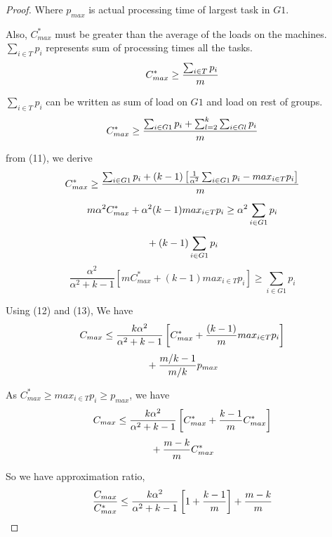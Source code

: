 \documentclass[10pt, conference, compsocconf]{IEEEtran}
\begin{document}
\begin{proof}
Where $p_{max}$ is actual processing time of largest task in $G1$. 

Also, $C_{max}^{*}$ must be greater than the average of the  loads on   the machines. $\sum_{i \in T }{{p_{i}}}$ represents sum of processing times all the tasks.
\begin{equation}{\nonumber}
C_{max}^{*} \geq  \frac{\sum_{i \in T }^{}{{p_{i}}}}{m}
\end{equation}

$\sum_{i \in T }{{p_{i}}}$ can be written as sum of load on $G1$ and load on rest of groups.
\begin{equation}
{\nonumber} C_{max}^{*} \geq  \frac{\sum_{i \in G1 }^{}{{p_{i}}}+ \sum_{l=2}^{k}\sum_{i \in Gl }^{}{{p_{i}}}}{m}
\end{equation}

from (11), we derive
\begin{equation}{\nonumber}
 C_{max}^{*} \geq  \frac{\sum_{i \in G1 }^{}{{p_{i}}}+ (k-1)\left[\frac{1}{\alpha^{2}}\sum_{i \in G1 }^{}{{p_{i}}}-  {max_{i \in T}}{{p_{i}}}\right]}{m}
\end{equation}
\begin{equation}{\nonumber}
 m\alpha^{2}C_{max}^{*} + \alpha^{2} (k-1){max_{i \in T}}{{p_{i}}} \geq  \alpha^{2}\sum_{i \in G1 }^{}{{p_{i}}}  
\end{equation}
\begin{equation}{\nonumber}
 + (k-1)\sum_{i \in G1 }^{}{{p_{i}}} 
\end{equation}
\begin{equation}
\frac{\alpha^{2}}{\alpha^{2}+k-1}\left[m C_{max}^{*}+(k-1) {max_{i \in T}}{{p_{i}}}\right] \geq \sum_{i \in G1 }^{}{{p_{i}}}  
\end{equation}

Using (12) and (13), We have
\begin{equation}{\nonumber}
C_{max} \leq \frac{k\alpha^{2}}{\alpha^{2}+k-1}\left[ C_{max}^{*}+\frac{(k-1)}{m} {max_{i \in T}}{{p_{i}}}\right]
\end{equation}
\begin{equation}{\nonumber}
 + {\frac{m/k-1}{m/k}} p_{max} 
\end{equation}

 As $C_{max}^{*}\geq {{max_{i \in T}}{p_{i}}}\geq p_{max}$, we have
\begin{equation}{\nonumber}
 C_{max} \leq \frac{k\alpha^{2}}{\alpha^{2}+k-1}\left[ C_{max}^{*}+ {\frac{k-1}{m}}{C_{max}^{*}}\right] 
  \end{equation}
 \begin{equation}{\nonumber}
   + {\frac{m-k}{m}} C_{max}^{*} 
   \end{equation} 
 
 So we have approximation ratio,
 \begin{equation}{\nonumber}
\frac{C_{max}}{C_{max}^{*}} \leq \frac{k\alpha^{2}}{\alpha^{2}+k-1}\left[1+ {\frac{k-1}{m}} \right]+ {\frac{m-k}{m}} \end{equation}
 
\end{proof}
\end{document}
